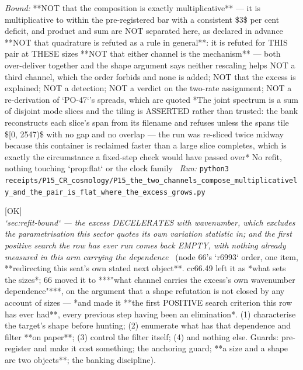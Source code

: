 \begin{description}
 \emph{Bound:}  **NOT that the composition is exactly multiplicative** --- it is multiplicative to within the pre-registered bar with a consistent \$3\$ per cent deficit, and product and sum are NOT separated here, as declared in advance  **NOT that quadrature is refuted as a rule in general**: it is refuted for THIS pair at THESE sizes  **NOT that either channel is the mechanism** --- both over-deliver together and the shape argument says neither rescaling helps  NOT a third channel, which the order forbids and none is added; NOT that the excess is explained; NOT a detection; NOT a verdict on the two-rate assignment; NOT a re-derivation of `PO-47`'s spreads, which are quoted  *The joint spectrum is a sum of disjoint mode slices and the tiling is ASSERTED rather than trusted: the bank reconstructs each slice's span from its filename and refuses unless the spans tile \$[0, 2547)\$ with no gap and no overlap --- the run was re-sliced twice midway because this container is reclaimed faster than a large slice completes, which is exactly the circumstance a fixed-step check would have passed over*  No refit, nothing touching `prop:flat` or the clock family
\ \emph{Run:} \texttt{python3 receipts/P15\_CR\_cosmology/P15\_the\_two\_channels\_compose\_multiplicatively\_and\_the\_pair\_is\_flat\_where\_the\_excess\_grows.py}
\item[\rcptlabel{P15_the_excess_decelerates_and_nothing_measured_in_this_arm_carries_its_wavenumber_dependence}{P15R197}\textbf{P15R197}\quad\texttt{P15\_the\_excess\_decelerates\_and\_nothing\_measured\_in\_this\_arm\_carries\_its\_wavenumber\_dependence}]\hfill\textsf{[OK]}\\
\textit{`sec:refit-bound` --- the excess DECELERATES with wavenumber, which excludes the parametrisation this sector quotes its own variation statistic in; and the first positive search the row has ever run comes back EMPTY, with nothing already measured in this arm carrying the dependence} \ (node 66's `r6993` order, one item, **redirecting this seat's own stated next object**. cc66.49 left it as *what sets the sizes*; 66 moved it to ***"what channel carries the excess's own wavenumber dependence"***, on the argument that a shape refutation is not closed by any account of sizes ---  *and made it **the first POSITIVE search criterion this row has ever had**, every previous step having been an elimination*. (1) characterise the target's shape before hunting; (2) enumerate what has that dependence and filter **on paper**; (3) control the filter itself; (4) and nothing else.  Guards: pre-register and make it cost something; the anchoring guard; **a size and a shape are two objects**; the banking discipline). 

\end{description}
